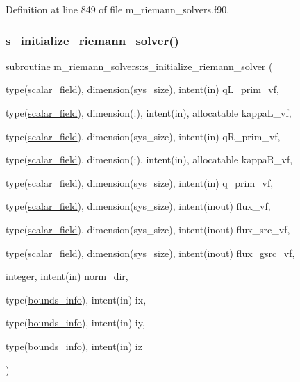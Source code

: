 Definition at line 849 of file m\+\_\+riemann\+\_\+solvers.\+f90.

\mbox{\label{namespacem__riemann__solvers_a86766279fcf7527f2b148adff4666b1c}} 
\subsubsection{\texorpdfstring{s\+\_\+initialize\+\_\+riemann\+\_\+solver()}{s\_initialize\_riemann\_solver()}}
{\footnotesize\ttfamily subroutine m\+\_\+riemann\+\_\+solvers\+::s\+\_\+initialize\+\_\+riemann\+\_\+solver (\begin{DoxyParamCaption}\item[{type(\hyperlink{structm__derived__types_1_1scalar__field}{scalar\+\_\+field}), dimension(sys\+\_\+size), intent(in)}]{q\+L\+\_\+prim\+\_\+vf,  }\item[{type(\hyperlink{structm__derived__types_1_1scalar__field}{scalar\+\_\+field}), dimension(\+:), intent(in), allocatable}]{kappa\+L\+\_\+vf,  }\item[{type(\hyperlink{structm__derived__types_1_1scalar__field}{scalar\+\_\+field}), dimension(sys\+\_\+size), intent(in)}]{q\+R\+\_\+prim\+\_\+vf,  }\item[{type(\hyperlink{structm__derived__types_1_1scalar__field}{scalar\+\_\+field}), dimension(\+:), intent(in), allocatable}]{kappa\+R\+\_\+vf,  }\item[{type(\hyperlink{structm__derived__types_1_1scalar__field}{scalar\+\_\+field}), dimension(sys\+\_\+size), intent(in)}]{q\+\_\+prim\+\_\+vf,  }\item[{type(\hyperlink{structm__derived__types_1_1scalar__field}{scalar\+\_\+field}), dimension(sys\+\_\+size), intent(inout)}]{flux\+\_\+vf,  }\item[{type(\hyperlink{structm__derived__types_1_1scalar__field}{scalar\+\_\+field}), dimension(sys\+\_\+size), intent(inout)}]{flux\+\_\+src\+\_\+vf,  }\item[{type(\hyperlink{structm__derived__types_1_1scalar__field}{scalar\+\_\+field}), dimension(sys\+\_\+size), intent(inout)}]{flux\+\_\+gsrc\+\_\+vf,  }\item[{integer, intent(in)}]{norm\+\_\+dir,  }\item[{type(\hyperlink{structm__derived__types_1_1bounds__info}{bounds\+\_\+info}), intent(in)}]{ix,  }\item[{type(\hyperlink{structm__derived__types_1_1bounds__info}{bounds\+\_\+info}), intent(in)}]{iy,  }\item[{type(\hyperlink{structm__derived__types_1_1bounds__info}{bounds\+\_\+info}), intent(in)}]{iz }\end{DoxyParamCaption})}



